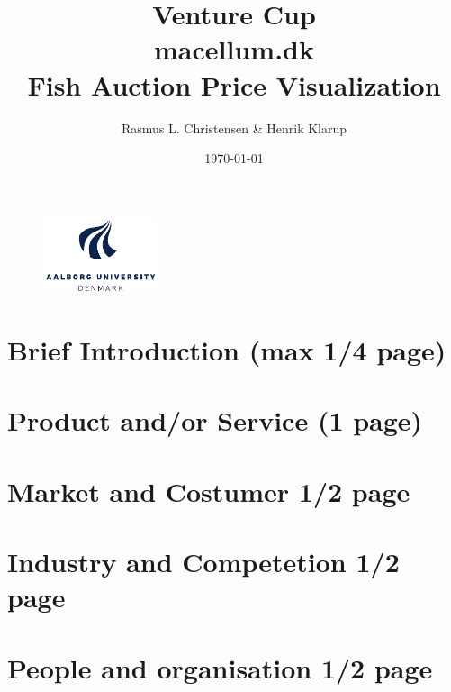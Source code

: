 \documentclass[a4paper,12pt,oneside,fleqn]{article}
\begin{document}
\author{Rasmus L. Christensen \& Henrik Klarup}
\title{Venture Cup\\
macellum.dk\\
Fish Auction Price Visualization}
\date{\today}
\maketitle
\begin{centering}
\begin{figure}[htpb]
	\centering
	\includegraphics[width=0.3\textwidth]{aaulogo.pdf}
	\label{fig:aauLOGO}
\end{figure}	
\end{centering}

\cleardoublepage

\tableofcontents

\cleardoublepage

\section{Brief Introduction (max 1/4 page)}

\section{Product and/or Service (1 page)}

\section{Market and Costumer 1/2 page}

\section{Industry and Competetion 1/2 page}

\section{People and organisation 1/2 page}
\end{document}
